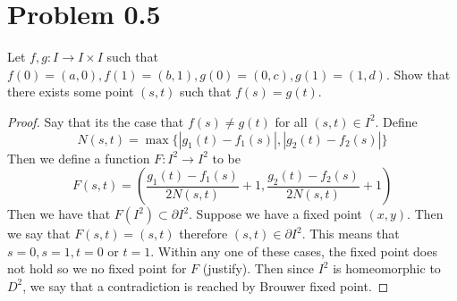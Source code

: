 \documentclass{article}
\theoremstyle{definition}
\begin{document}
\section{Problem 0.5}
    \begin{mdframed}[]
        Let $f,g : I \rightarrow I \times I$ such that $f(0) = (a, 0), f(1) = (b,1), g(0) = (0,c), g(1) = (1,d)$.
        Show that there exists some point $(s,t)$ such that $f(s) = g(t)$.
    \end{mdframed}
    \begin{proof}
        Say that its the case that $f(s) \neq g(t)$ for all $(s,t) \in I^2$. Define 
        \[
            N(s,t) = \max\{ |g_1(t) - f_1(s)| , |g_2(t) - f_2(s)|\}
        \]
        Then we define a function $F: I^2 \rightarrow I^2$ to be 
        \[
            F(s,t) = \left(
                \frac{g_1(t) - f_1(s)}{2 N(s,t)} + 1, \frac{g_2(t) - f_2(s)}{2 N(s,t)} + 1
            \right)
        \]
        Then we have that $F(I^2) \subset \partial I^2$.
        Suppose we have a fixed point $(x,y)$. Then we say that $F(s,t) = (s,t)$ therefore $(s,t) \in \partial I^2$.
        This means that $s = 0, s=1, t = 0$ or $t = 1$. Within any one of these cases, the fixed point does not hold so we 
        no fixed point for $F$ (justify). Then since $I^2$ is homeomorphic to $D^2$, we say that a contradiction is reached 
        by Brouwer fixed point.
    \end{proof}
\end{document}
